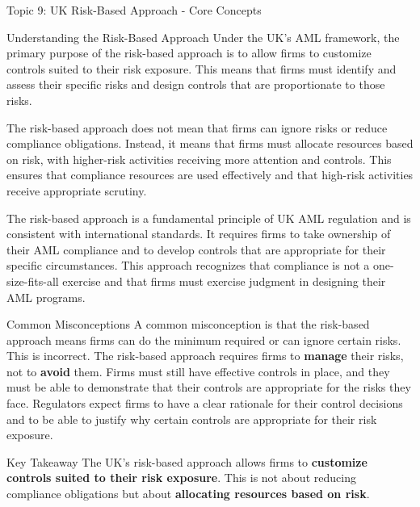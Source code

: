 \documentclass[5pt]{beamer}
\begin{document}
	\begin{frame}{Topic 9: UK Risk-Based Approach - Core Concepts}
		\begin{block}{\tiny Understanding the Risk-Based Approach}
			\tiny Under the UK's AML framework, the primary purpose of the risk-based approach is to allow firms to customize controls suited to their risk exposure. This means that firms must identify and assess their specific risks and design controls that are proportionate to those risks.
			
			The risk-based approach does not mean that firms can ignore risks or reduce compliance obligations. Instead, it means that firms must allocate resources based on risk, with higher-risk activities receiving more attention and controls. This ensures that compliance resources are used effectively and that high-risk activities receive appropriate scrutiny.
			
			The risk-based approach is a fundamental principle of UK AML regulation and is consistent with international standards. It requires firms to take ownership of their AML compliance and to develop controls that are appropriate for their specific circumstances. This approach recognizes that compliance is not a one-size-fits-all exercise and that firms must exercise judgment in designing their AML programs.
		\end{block}
		
		\begin{block}{\tiny Common Misconceptions}
			\tiny A common misconception is that the risk-based approach means firms can do the minimum required or can ignore certain risks. This is incorrect. The risk-based approach requires firms to \textbf{manage} their risks, not to \textbf{avoid} them. Firms must still have effective controls in place, and they must be able to demonstrate that their controls are appropriate for the risks they face. Regulators expect firms to have a clear rationale for their control decisions and to be able to justify why certain controls are appropriate for their risk exposure.
		\end{block}
		
		\begin{alertblock}{Key Takeaway}
			\tiny The UK's risk-based approach allows firms to \textbf{customize controls suited to their risk exposure}. This is not about reducing compliance obligations but about \textbf{allocating resources based on risk}.
		\end{alertblock}
	\end{frame}
	
\end{document}
